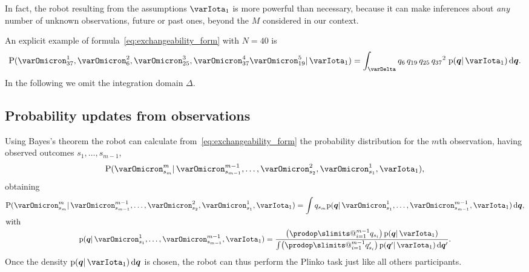 \documentclass[\ifafour a4paper,12pt,\else a5paper,10pt,\fi%
onecolumn,oneside,article,%
british%
]{memoir}
\makeatletter
\theoremstyle{remark}
\theoremstyle{innote}
\def\prod{\DOTSI\prodop\slimits@}
\newcommand*{\di}{\mathrm{d}}%
\newcommand*{\pf}{\mathrm{p}}%
\newcommand*{\p}{\mathrm{P}}%
\renewcommand*{\|}{\mathpunct{|}}
\newcommand*{\simpl}{\varDelta}
\newcommand*{\yqq}{q}
\newcommand*{\yq}{\bm{\yqq}}
\newcommand*{\yI}{\varIota}
\newcommand*{\yMJ}{\yI_1}
\makeatother
\begin{document}
In fact, the robot resulting from the assumptions $\yMJ$ is more powerful
than necessary, because it can make inferences about \emph{any} number of
unknown observations, future or past ones, beyond the $M$ considered in our
context.

An explicit example of formula~\eqref{eq:exchangeability_form} with $N=40$ is
\begin{equation}
  \label{eq:exchangeability_form_example}
  \p(\varOmicron^1_{37} , \varOmicron^2_{6} , \varOmicron^3_{25}, \varOmicron^4_{37} \varOmicron^5_{19}\| \yMJ) =
  \int_\simpl \yqq_{6}\,\yqq_{19}\, \yqq_{25} \, {\yqq_{37}}^2\;
  \pf(\yq \| \yMJ)\,\di\yq.
\end{equation}
In the following we omit the integration domain $\simpl$.

\subsection{Probability updates from observations}
\label{sec:update_first_robot}

Using Bayes's theorem the robot can calculate
from~\eqref{eq:exchangeability_form} the probability distribution for the
$m$th observation, having observed outcomes $s_1,\dotsc,s_{m-1}$,
\begin{equation}
  \label{eq:general_prediction}
  \p(\varOmicron^{m}_{s_{m}} \|
  \varOmicron^{m-1}_{s_{m-1}}, \dotsc,  \varOmicron^2_{s_2}, \varOmicron^1_{s_1},  \yMJ),
\end{equation}
obtaining
\begin{subequations}\label{eq:prediction_exchangeability}
  \begin{gather}
    \p(\varOmicron^{m}_{s_{m}}\| \varOmicron^{m-1}_{s_{m-1}}, \dotsc,  \varOmicron^2_{s_2}, \varOmicron^1_{s_1}, \yMJ)
    = \int \yqq_{s_{m}} \pf(\yq \| \varOmicron^1_{s_1}, \dotsc, \varOmicron^{m-1}_{s_{m-1}}, \yMJ)\,\di\yq,
    \\
    \shortintertext{with}
    \pf(\yq \| \varOmicron^1_{s_1}, \dotsc, \varOmicron^{m-1}_{s_{m-1}}, \yMJ)
    = \frac{ \bigl( \prod_{i=1}^{m-1} \yqq_{s_i} \bigr)\, \pf(\yq \| \yMJ)
      }{
      \int  \bigl( \prod_{i=1}^{m-1} \yqq_{s_i}' \bigr)\, \pf(\yq' \| \yMJ)\,\di\yq'
      }.
\label{eq:exchang_updated_prior}
  \end{gather}
\end{subequations}
Once the density $\pf(\yq \| \yMJ)\,\di\yq$ is chosen, the robot can thus perform
the Plinko task just like all others participants.
\end{document}
